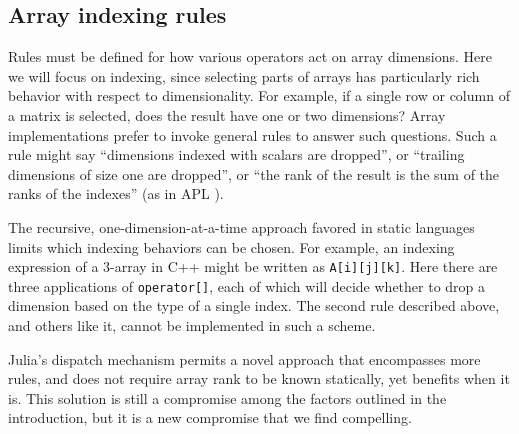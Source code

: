 \documentclass{sigplanconf}
\newcommand{\code}[1]{\texttt{#1}}
\begin{document}


\subsection{Array indexing rules}

Rules must be defined for how various operators act
on array dimensions. Here we will focus on indexing, since selecting parts of
arrays has particularly rich behavior with respect to dimensionality. For
example, if a single row or column of a matrix is selected, does the result
have one or two dimensions? Array implementations prefer to invoke general
rules to answer such questions. Such a rule might say ``dimensions indexed
with scalars are dropped'', or ``trailing dimensions of size one are
dropped'', or ``the rank of the result is the sum of the ranks of the
indexes'' (as in APL \cite{APL}).

The recursive, one-dimension-at-a-time approach favored in static languages limits
which indexing behaviors can be chosen. For example, an indexing expression
of a 3-array in C++ might be written as \code{A[i][j][k]}. Here there are 
three applications of \code{operator[]}, each of which will decide whether to
drop a dimension based on the type of a single index. The second rule
described above, and others like it, cannot be implemented in such a
scheme.

Julia's dispatch mechanism permits a novel approach that encompasses more
rules, and does not require array rank to be known statically, yet
benefits when it is.
This solution is still a compromise among the factors outlined in
the introduction, but it is a new compromise that we find compelling.

\end{document}
